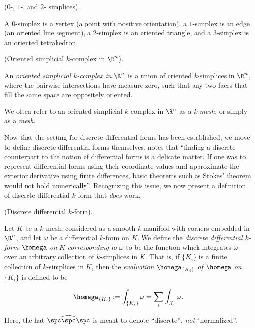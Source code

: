\begin{example}
    ($0$-, $1$-, and $2$- simplices). 
    
    A $0$-simplex is a vertex (a point with positive orientation), a $1$-simplex is an edge (an oriented line segment), a $2$-simplex is an oriented triangle, and a $3$-simplex is an oriented tetrahedron.
\end{example}

\begin{defn}
\label{ch::ddg::defn::mesh}
    (Oriented simplicial $k$-complex in $\R^n$).
    
    An \textit{oriented simplicial $k$-complex in $\R^n$} is a union of oriented $k$-simplices in $\R^n$, where the pairwise intersections have measure zero, such that any two faces that fill the same space are oppositely oriented. 
    
    We often refer to an oriented simplicial $k$-complex in $\R^n$ as a \textit{$k$-mesh}, or simply as a \textit{mesh}.
\end{defn}

Now that the setting for discrete differential forms has been established, we move to define discrete differential forms themselves. \cite{DDGArticle} notes that ``finding a discrete counterpart to the notion of differential forms is a delicate matter. If one was to represent differential forms using their coordinate values and approximate the exterior derivative using finite differences, basic theorems such as Stokes’ theorem would not hold numerically''. Recognizing this issue, we now present a definition of discrete differential $k$-form that \textit{does} work.

\begin{defn}
    (Discrete differential $k$-form).
    
    Let $K$ be a $k$-mesh, considered as a smooth $k$-manifold with corners embedded in $\R^n$, and let $\omega$ be a differential $k$-form on $K$. We define the \textit{discrete differential $k$-form $\homega$ on $K$ corresponding to $\omega$} to be the function which integrates $\omega$ over an arbitrary collection of $k$-simplices in $K$. That is, if $\{K_i\}$ is a finite collection of $k$-simplices in $K$, then the \textit{evaluation $\homega_{\{K_i\}}$ of $\homega$ on $\{K_i\}$} is defined to be
    
    \begin{align*}
        \homega_{\{K_i\}} := \int_{\{K_i\}} \omega = \sum_i \int_{K_i} \omega.
    \end{align*}
    
    Here, the hat $\spc\widehat{\spc}\spc$ is meant to denote ``discrete'', \textit{not} ``normalized''.
\end{defn}


